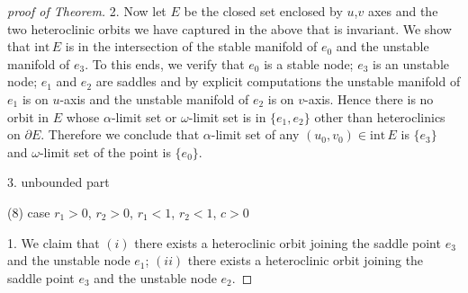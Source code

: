 \documentclass{amsart}
\def\red{\color{red}}
\theoremstyle{definition}
\numberwithin{equation}{section}
\def\ii{{\textrm{int}}\,}
\begin{document}
\begin{proof}[proof of Theorem]
2. Now let $E$ be the closed set enclosed by $u$,$v$ axes and the two heteroclinic orbits we have captured in the above that is invariant. We show that $\ii E$ is in the intersection of the stable manifold of $e_0$ and the unstable manifold of $e_3$. To this ends, we verify that $e_0$ is a stable node; $e_3$ is an unstable node; $e_1$ and $e_2$ are saddles and by explicit computations the unstable manifold of $e_1$ is on $u$-axis and the unstable manifold of $e_2$ is on $v$-axis. Hence there is no orbit in $E$ whose $\alpha$-limit set or $\omega$-limit set is in $\{e_1,e_2\}$ other than heteroclinics on $\partial E$. Therefore we conclude that $\alpha$-limit set of any $(u_0,v_0) \in\ii E$ is $\{e_3\}$ and $\omega$-limit set of the point is $\{e_0\}$.

% 
% 
% 
% 

3. {\red unbounded part}


\bigskip\bigskip

(8) case  $r_1>0$, $r_2>0$, $r_1<1$, $r_2<1$, $c>0$

1. We claim that $(i)$ there exists a heteroclinic orbit joining the saddle point $e_3$ and the unstable node $e_1$;  $(ii)$ there exists a heteroclinic orbit joining the saddle point $e_3$ and the unstable node $e_2$. 


\end{proof}
\end{document}
